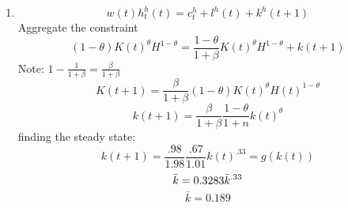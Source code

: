 \begin{enumerate}
    \item  
   $$ w(t)h^h_t(t)=c^h_t+l^h(t)+k^h(t+1)$$
   Aggregate the constraint
   $$(1-\theta)K(t)^\theta H^{1-\theta}=\frac{1-\theta}{1+\beta}K(t)^\theta H^{1-\theta}+k(t+1)$$
   Note: $1-\frac{1}{1+\beta}=\frac{\beta}{1+\beta}$
   $$K(t+1)=\frac{\beta}{1+\beta}(1-\theta)K(t)^\theta H(t)^{1-\theta}$$
   $$k(t+1)=\frac{\beta}{1+\beta}\frac{1-\theta}{1+n}k(t)^\theta$$
   finding the steady state:
    $$k(t+1)=\frac{.98}{1.98}\frac{.67}{1.01}k(t)^{.33}=g(k(t))$$
     $$\bar{k}=0.3283\Bar{k}^{.33}$$
     $$\bar{k}=0.189$$
\end{enumerate}